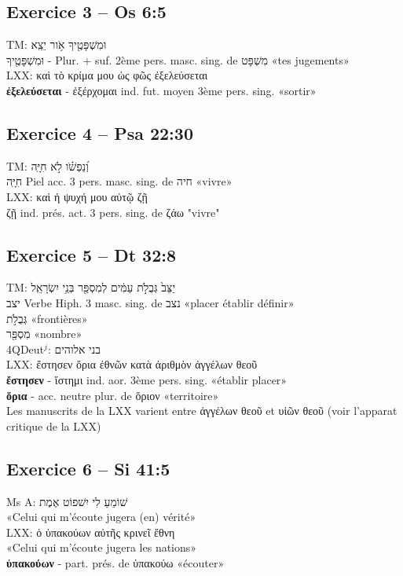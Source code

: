 \documentclass[11pt,a4paper]{article}
\begin{document}
\subsection{Exercice 3 – Os 6:5}
TM: \texthebrew{וּמִשְׁפָּטֶ֖יךָ אֹ֥ור יֵצֵֽא} \\
\texthebrew{וּמִשְׁפָּטֶ֖יךָ} - Plur. + suf. 2ème pers. masc. sing. de \texthebrew{מִשְׁפָּט} «tes jugements» \\
LXX: \textgreek{καὶ τὸ κρίμα μου ὡς φῶς ἐξελεύσεται} \\
\textbf{ἐξελεύσεται} - \textgreek{ἐξέρχομαι} ind. fut. moyen 3ème pers. sing. «sortir»

\subsection{Exercice 4 – Psa 22:30}
TM: \texthebrew{וְ֝נַפְשֹׁ֗ו לֹ֣א חִיָּֽה} \\
\texthebrew{חִיָּֽה} Piel acc. 3 pers. masc. sing. de \texthebrew{חיה} «vivre» \\
LXX: \textgreek{καὶ ἡ ψυχή μου αὐτῷ ζῇ} \\
\textgreek{ζῇ} ind. prés. act. 3 pers. sing. de \textgreek{ζάω} "vivre"

\subsection*{Exercice 5 – Dt 32:8}
TM: \texthebrew{יַצֵּב֙ גְּבֻלֹ֣ת עַמִּ֔ים לְמִסְפַּ֖ר בְּנֵ֥י יִשְׂרָאֵֽל} \\
\texthebrew{יצב} Verbe Hiph. 3 masc. sing. de \texthebrew{נצב} «placer établir définir» \\
\texthebrew{גְּבֻלֹ֣ת} «frontières» \\
\texthebrew{מִסְפַּ֖ר} «nombre» \\
4QDeut${^j}$: \texthebrew{בני אלוהים} \\
LXX: \textgreek{ἔστησεν ὅρια ἐθνῶν κατὰ ἀριθμὸν ἀγγέλων θεοῦ} \\
\textbf{ἔστησεν} - \textgreek{ἵστημι} ind. aor. 3ème pers. sing. «établir placer» \\
\textbf{ὅρια} - acc. neutre plur. de \textgreek{ὅριον} «territoire» \\
Les manuscrits de la LXX varient entre \textgreek{ἀγγέλων θεοῦ} et \textgreek{υἱῶν θεοῦ} (voir l’apparat critique de la LXX)

\subsection*{Exercice 6 – Si 41:5}
Ms A: \texthebrew{שׁוֹמֵעַ לִי יִשׁפוֹט אֶמֶת} \\
«Celui qui m’écoute jugera (en) vérité» \\
LXX: \textgreek{ὁ ὑπακούων αὐτῆς κρινεῖ ἔθνη} \\
«Celui qui m’écoute jugera les nations» \\
\textbf{ὑπακούων} - part. prés. de \textgreek{ὑπακούω} «écouter»
\end{document}
